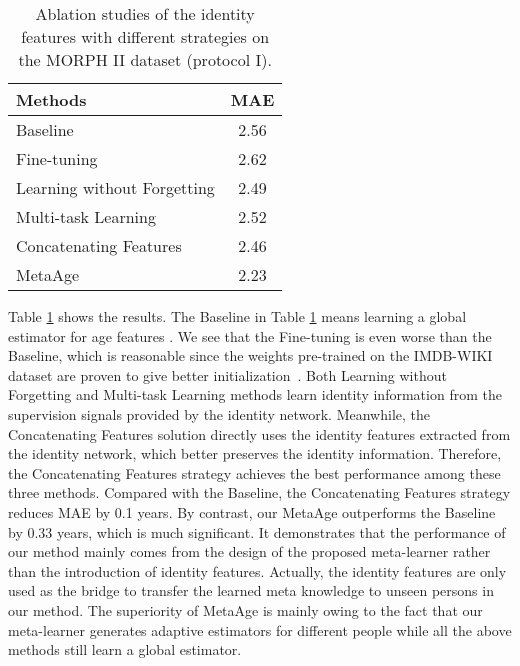 \documentclass[journal,twoside]{IEEEtran}
\begin{document}
\begin{table}[t]
\caption{Ablation studies of the identity features with different strategies on the MORPH II dataset (protocol I).}
\renewcommand\tabcolsep{25pt}
\label{table:identityfeature}
\centering
\begin{tabular}{lc}
\toprule
Methods  & MAE \\
\midrule
Baseline & 2.56  \\
\midrule
Fine-tuning & 2.62  \\
Learning without Forgetting & 2.49 \\
Multi-task Learning & 2.52 \\
Concatenating Features & 2.46 \\
\midrule
MetaAge & 2.23 \\
\bottomrule
\end{tabular}
\end{table}


Table \ref{table:identityfeature} shows the results. The Baseline in Table \ref{table:identityfeature} means learning a global estimator for age features . We see that the Fine-tuning is even worse than the Baseline, which is reasonable since the weights pre-trained on the IMDB-WIKI dataset are proven to give better initialization~\cite{wen2020adaptive}. Both Learning without Forgetting and Multi-task Learning methods learn identity information from the supervision signals provided by the identity network. Meanwhile, the Concatenating Features solution directly uses the identity features extracted from the identity network, which better preserves the identity information. Therefore, the Concatenating Features strategy achieves the best performance among these three methods. Compared with the Baseline, the Concatenating Features strategy reduces MAE by 0.1 years. By contrast, our MetaAge outperforms the Baseline by 0.33 years, which is much significant. It demonstrates that the performance of our method mainly comes from the design of the proposed meta-learner rather than the introduction of identity features. Actually, the identity features are only used as the bridge to transfer the learned meta knowledge to unseen persons in our method. The superiority of MetaAge is mainly owing to the fact that our meta-learner generates adaptive estimators for different people while all the above methods still learn a global estimator.
\end{document}
